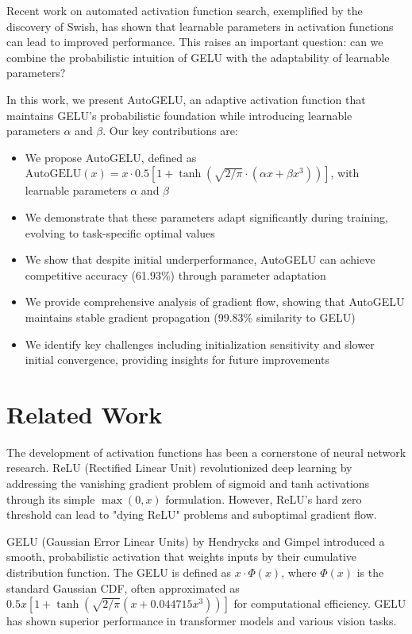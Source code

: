 \documentclass{article} %
\begin{document}
Recent work on automated activation function search, exemplified by the discovery of Swish, has shown that learnable parameters in activation functions can lead to improved performance. This raises an important question: can we combine the probabilistic intuition of GELU with the adaptability of learnable parameters?

In this work, we present AutoGELU, an adaptive activation function that maintains GELU's probabilistic foundation while introducing learnable parameters $\alpha$ and $\beta$. Our key contributions are:

\begin{itemize}
\item We propose AutoGELU, defined as $\text{AutoGELU}(x) = x \cdot 0.5[1 + \tanh(\sqrt{2/\pi} \cdot (\alpha x + \beta x^3))]$, with learnable parameters $\alpha$ and $\beta$
\item We demonstrate that these parameters adapt significantly during training, evolving to task-specific optimal values
\item We show that despite initial underperformance, AutoGELU can achieve competitive accuracy (61.93\%) through parameter adaptation
\item We provide comprehensive analysis of gradient flow, showing that AutoGELU maintains stable gradient propagation (99.83\% similarity to GELU)
\item We identify key challenges including initialization sensitivity and slower initial convergence, providing insights for future improvements
\end{itemize}

\section{Related Work}

The development of activation functions has been a cornerstone of neural network research. ReLU (Rectified Linear Unit) \citep{relu2010} revolutionized deep learning by addressing the vanishing gradient problem of sigmoid and tanh activations through its simple $\max(0,x)$ formulation. However, ReLU's hard zero threshold can lead to "dying ReLU" problems and suboptimal gradient flow.

GELU (Gaussian Error Linear Units) by Hendrycks and Gimpel \citep{hendrycks2016gelu} introduced a smooth, probabilistic activation that weights inputs by their cumulative distribution function. The GELU is defined as $x \cdot \Phi(x)$, where $\Phi(x)$ is the standard Gaussian CDF, often approximated as $0.5x[1 + \tanh(\sqrt{2/\pi}(x + 0.044715x^3))]$ for computational efficiency. GELU has shown superior performance in transformer models and various vision tasks.
\end{document}
